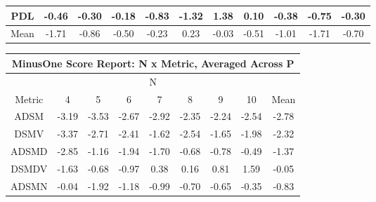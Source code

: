 \documentclass[11pt,a4paper]{report}
\begin{document}
\begin{longtable}{ | c || c | c | c | c | c | c | c | c | c || c |}
PDL &  \cellcolor[HTML]{FFF7F7} -0.46 &  \cellcolor[HTML]{FFF7F7} -0.30 &  \cellcolor[HTML]{FFF7F7} -0.18 &  \cellcolor[HTML]{FFE7E7} -0.83 &  \cellcolor[HTML]{FFDFDF} -1.32 &  \cellcolor[HTML]{DFDFFF} 1.38 &  \cellcolor[HTML]{FFFFFF} 0.10 &  \cellcolor[HTML]{FFF7F7} -0.38 &  \cellcolor[HTML]{FFEFEF} -0.75 &  \cellcolor[HTML]{FFF7F7} -0.30 \\
\hline
\hline
Mean  &  \cellcolor[HTML]{FFD7D7} -1.71 &  \cellcolor[HTML]{FFE7E7} -0.86 &  \cellcolor[HTML]{FFEFEF} -0.50 &  \cellcolor[HTML]{FFF7F7} -0.23 &  \cellcolor[HTML]{F7F7FF} 0.23 &  \cellcolor[HTML]{FFFFFF} -0.03 &  \cellcolor[HTML]{FFEFEF} -0.51 &  \cellcolor[HTML]{FFE7E7} -1.01 &  \cellcolor[HTML]{FFD7D7} -1.71 &  \cellcolor[HTML]{FFEFEF} -0.70 \\
\hline
\end{longtable}
\begin{longtable}{ | c || c | c | c | c | c | c | c || c |}
\hline
\multicolumn{9}{|c|}{ MinusOne Score Report: N x Metric, Averaged Across P } \\
\hline
\multicolumn{9}{|c|}{ N } \\
\hline
Metric & 4 & 5 & 6 & 7 & 8 & 9 & 10 & Mean\\
\hline
\hline
\endhead
ADSM &  \cellcolor[HTML]{FFAFAF} -3.19 &  \cellcolor[HTML]{FFA7A7} -3.53 &  \cellcolor[HTML]{FFBFBF} -2.67 &  \cellcolor[HTML]{FFB7B7} -2.92 &  \cellcolor[HTML]{FFC7C7} -2.35 &  \cellcolor[HTML]{FFC7C7} -2.24 &  \cellcolor[HTML]{FFBFBF} -2.54 &  \cellcolor[HTML]{FFB7B7} -2.78 \\
DSMV &  \cellcolor[HTML]{FFA7A7} -3.37 &  \cellcolor[HTML]{FFB7B7} -2.71 &  \cellcolor[HTML]{FFBFBF} -2.41 &  \cellcolor[HTML]{FFD7D7} -1.62 &  \cellcolor[HTML]{FFBFBF} -2.54 &  \cellcolor[HTML]{FFD7D7} -1.65 &  \cellcolor[HTML]{FFCFCF} -1.98 &  \cellcolor[HTML]{FFC7C7} -2.32 \\
ADSMD &  \cellcolor[HTML]{FFB7B7} -2.85 &  \cellcolor[HTML]{FFDFDF} -1.16 &  \cellcolor[HTML]{FFCFCF} -1.94 &  \cellcolor[HTML]{FFD7D7} -1.70 &  \cellcolor[HTML]{FFEFEF} -0.68 &  \cellcolor[HTML]{FFEFEF} -0.78 &  \cellcolor[HTML]{FFEFEF} -0.49 &  \cellcolor[HTML]{FFDFDF} -1.37 \\
DSMDV &  \cellcolor[HTML]{FFD7D7} -1.63 &  \cellcolor[HTML]{FFEFEF} -0.68 &  \cellcolor[HTML]{FFE7E7} -0.97 &  \cellcolor[HTML]{F7F7FF} 0.38 &  \cellcolor[HTML]{F7F7FF} 0.16 &  \cellcolor[HTML]{E7E7FF} 0.81 &  \cellcolor[HTML]{D7D7FF} 1.59 &  \cellcolor[HTML]{FFFFFF} -0.05 \\
ADSMN &  \cellcolor[HTML]{FFFFFF} -0.04 &  \cellcolor[HTML]{FFCFCF} -1.92 &  \cellcolor[HTML]{FFDFDF} -1.18 &  \cellcolor[HTML]{FFE7E7} -0.99 &  \cellcolor[HTML]{FFEFEF} -0.70 &  \cellcolor[HTML]{FFEFEF} -0.65 &  \cellcolor[HTML]{FFF7F7} -0.35 &  \cellcolor[HTML]{FFE7E7} -0.83 \\

\end{longtable}
\end{document}
